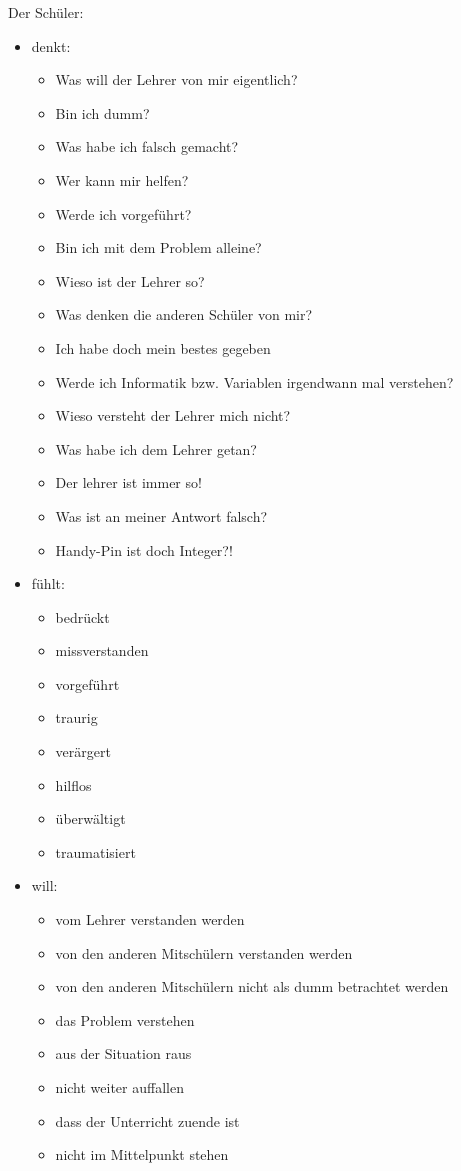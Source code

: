 \documentclass[12pt]{scrartcl}
\begin{document}
Der Schüler:
\begin{itemize}
  \item denkt:
  \begin{itemize}
    \item Was will der Lehrer von mir eigentlich?
    \item Bin ich dumm?
    \item Was habe ich falsch gemacht?
    \item Wer kann mir helfen?
    \item Werde ich vorgeführt?
    \item Bin ich mit dem Problem alleine?
    \item Wieso ist der Lehrer so?
    \item Was denken die anderen Schüler von mir?
    \item Ich habe doch mein bestes gegeben
    \item Werde ich Informatik bzw. Variablen irgendwann mal verstehen?
    \item Wieso versteht der Lehrer mich nicht?
    \item Was habe ich dem Lehrer getan?
    \item Der lehrer ist immer so!
    \item Was ist an meiner Antwort falsch?
    \item Handy-Pin ist doch Integer?!
  \end{itemize}
  \item fühlt:
  \begin{itemize}
    \item bedrückt
    \item missverstanden
    \item vorgeführt
    \item traurig
    \item verärgert
    \item hilflos
    \item überwältigt
    \item traumatisiert
  \end{itemize}
  \item will:
  \begin{itemize}
  \item vom Lehrer verstanden werden
  \item von den anderen Mitschülern verstanden werden
  \item von den anderen Mitschülern nicht als dumm betrachtet werden
  \item das Problem verstehen
  \item aus der Situation raus
  \item nicht weiter auffallen
  \item dass der Unterricht zuende ist
  \item nicht im Mittelpunkt stehen
  \end{itemize}
\end{itemize}
\end{document}
